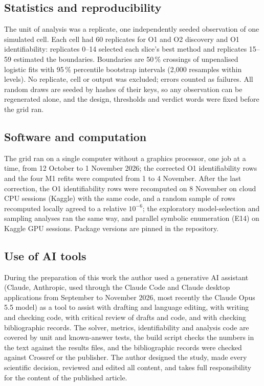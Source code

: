\documentclass[11pt]{article}
\begin{document}
\subsection*{Statistics and reproducibility}
The unit of analysis was a replicate, one independently seeded observation of one simulated cell.
Each cell had 60 replicates for O1 and O2 discovery and O1 identifiability: replicates 0--14
selected each slice's best method and replicates 15--59 estimated the boundaries. Boundaries are
50\,\% crossings of unpenalised logistic fits with 95\,\% percentile bootstrap intervals (2,000
resamples within levels). No replicate, cell or output was excluded; errors counted as failures.
All random draws are seeded by hashes of their keys, so any observation can be regenerated alone,
and the design, thresholds and verdict words were fixed before the grid ran.

\subsection*{Software and computation}
The grid ran on a single computer without a graphics processor, one job at a time, from
12 October to 1 November 2026; the corrected O1 identifiability rows and the four M1 refits
were computed from 1 to 4 November. After the last correction, the O1 identifiability rows were
recomputed on 8 November on cloud CPU sessions (Kaggle) with the same code, and a random sample
of rows recomputed locally agreed to a relative $10^{-6}$; the exploratory model-selection and
sampling analyses ran the same way, and parallel symbolic enumeration (E14) on Kaggle GPU sessions.
Package versions are pinned in the repository.

\subsection*{Use of AI tools}
During the preparation of this work the author used a generative AI assistant (Claude, Anthropic,
used through the Claude Code and Claude desktop applications from September to November 2026, most
recently the Claude Opus 5.5 model) as a tool to assist with drafting and language editing, with
writing and checking code, with critical review of drafts and code, and with checking bibliographic records. The solver, metrics, identifiability and analysis
code are covered by unit and known-answer tests, the build script checks the numbers in the text against the results files,
and the bibliographic records were checked against Crossref or the publisher. The author designed the
study, made every scientific decision, reviewed and edited all content, and takes full
responsibility for the content of the published article.
\end{document}
